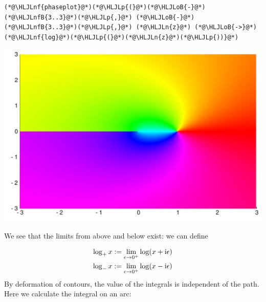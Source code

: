 \documentclass[12pt,a4paper]{article}
\newcommand{\HLJLn}[1]{#1}
\newcommand{\HLJLnf}[1]{\textcolor[RGB]{66,102,213}{#1}}
\newcommand{\HLJLnfB}[1]{\textcolor[RGB]{59,151,46}{#1}}
\newcommand{\HLJLoB}[1]{\textcolor[RGB]{102,102,102}{\textbf{#1}}}
\newcommand{\HLJLp}[1]{#1}
\def\I{ {\rm i} }
\begin{document}
\begin{lstlisting}
(*@\HLJLnf{phaseplot}@*)(*@\HLJLp{(}@*)(*@\HLJLoB{-}@*)(*@\HLJLnfB{3..3}@*)(*@\HLJLp{,}@*) (*@\HLJLoB{-}@*)(*@\HLJLnfB{3..3}@*)(*@\HLJLp{,}@*) (*@\HLJLn{z}@*) (*@\HLJLoB{->}@*) (*@\HLJLnf{log}@*)(*@\HLJLp{(}@*)(*@\HLJLn{z}@*)(*@\HLJLp{))}@*)
\end{lstlisting}

\includegraphics[width=\linewidth]{figures/Lecture10_2_1.pdf}

We see that the limits from above and below exist: we can define


\begin{align*}
\log_+ x &:= \lim_{\epsilon \rightarrow 0^+} \log(x+\I \epsilon) \\
\log_- x &:= \lim_{\epsilon \rightarrow 0^+} \log(x-\I \epsilon)
\end{align*}
By deformation of contours, the value of the integrals is independent of the path. Here we calculate the integral on an arc:
\end{document}
